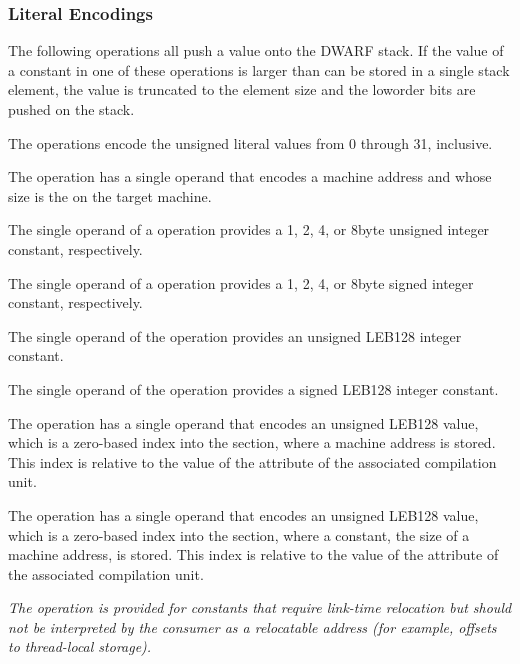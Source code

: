 \subsubsection{Literal Encodings}
\label{chap:literalencodings}
The 
following operations all push a value onto the DWARF
stack. 
If the value of a constant in one of these operations
is larger than can be stored in a single stack element, the
value is truncated to the element size and the low\dash order bits
are pushed on the stack.
\begin{enumerate}[1. ]
\itembfnl{\DWOPlitzeroTARG, \DWOPlitoneTARG, \dots, \DWOPlitthirtyoneTARG}
The \DWOPlitnTARG{} operations encode the unsigned literal values
from 0 through 31, inclusive.

\itembfnl{\DWOPaddrTARG}
The \DWOPaddrNAME{} operation has a single operand that encodes
a machine address and whose size is the 
on the target machine.

\itembfnl{\DWOPconstoneuTARG, \DWOPconsttwouTARG, \DWOPconstfouruTARG, \DWOPconsteightuTARG}
\DWOPconstnxMARK{}
The single operand of a \DWOPconstnuNAME{} operation provides a 1,
2, 4, or 8\dash byte unsigned integer constant, respectively.

\itembfnl{\DWOPconstonesTARG, \DWOPconsttwosTARG, \DWOPconstfoursTARG, \DWOPconsteightsTARG}
The single operand of a \DWOPconstnsNAME{} operation provides a 1,
2, 4, or 8\dash byte signed integer constant, respectively.

\itembfnl{\DWOPconstuTARG}
The single operand of the \DWOPconstuNAME{} operation provides
an unsigned LEB128 integer constant.

\itembfnl{\DWOPconstsTARG}
The single operand of the \DWOPconstsNAME{} operation provides
a signed LEB128 integer constant.

\itembfnl{\DWOPaddrxTARG}
The \DWOPaddrxNAME{} operation has a single operand that
encodes an unsigned LEB128 value, 
which is a zero-based index into the \dotdebugaddr{} section, 
where a machine address is stored.
This index is relative to the value of the 
\DWATaddrbase{} attribute of the associated compilation unit.

\itembfnl{\DWOPconstxTARG}
The \DWOPconstxNAME{} operation has a single operand that
encodes an unsigned LEB128 value, 
which is a zero-based
index into the \dotdebugaddr{} section, where a constant, the
size of a machine address, is stored.
This index is relative to the value of the 
\DWATaddrbase{} attribute of the associated compilation unit.

\textit{The \DWOPconstxNAME{} operation is provided for constants that
require link-time relocation but should not be
interpreted by the consumer as a relocatable address
(for example, offsets to thread-local storage).}

\end{enumerate}


